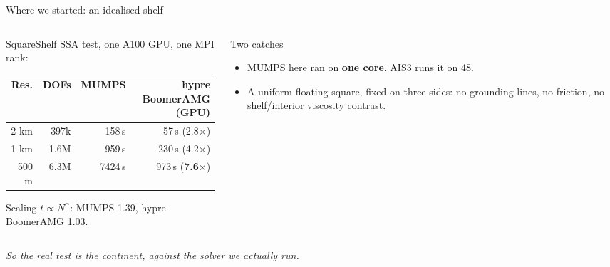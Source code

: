\documentclass[10pt,aspectratio=169]{beamer}
\newcommand{\good}[1]{\textcolor{green!55!black}{\textbf{#1}}}
\begin{document}
\begin{frame}{Where we started: an idealised shelf}
  \begin{columns}[T]
    \begin{column}{0.56\textwidth}
      \small
      SquareShelf SSA test, one A100 GPU, one MPI rank:
      \begin{center}
      \begin{tabular}{rrrr}
        \toprule
        Res. & DOFs & MUMPS & hypre BoomerAMG (GPU) \\
        \midrule
        2 km  & 397k  & 158\,s  & 57\,s (2.8$\times$) \\
        1 km  & 1.6M  & 959\,s  & 230\,s (4.2$\times$) \\
        500 m & 6.3M  & 7424\,s & 973\,s (\good{7.6$\times$}) \\
        \bottomrule
      \end{tabular}
      \end{center}
      Scaling $t\propto N^{\alpha}$: MUMPS 1.39, hypre BoomerAMG 1.03.
    \end{column}
    \begin{column}{0.42\textwidth}
      \begin{alertblock}{Two catches}
        \begin{itemize}
          \item MUMPS here ran on \textbf{one core}. AIS3 runs it on 48.
          \item A uniform floating square, fixed on three sides: no grounding
                lines, no friction, no shelf/interior viscosity contrast.
        \end{itemize}
      \end{alertblock}
    \end{column}
  \end{columns}
  \vspace{0.5em}
  \begin{center}
    \emph{So the real test is the continent, against the solver we actually run.}
  \end{center}
\end{frame}
\end{document}
